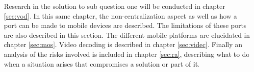 Research in the solution to sub question one will be conducted in chapter \ref{sec:vod}. In this same chapter, the non-centralization aspect as well as how a port can be made to mobile devices are described. The limitations of these ports are also described in this section. The different mobile platforms are elucidated in chapter \ref{sec:mos}. Video decoding is described in chapter \ref{sec:videc}. Finally an analysis of the risks involved is included in chapter \ref{sec:ra}, describing what to do when a situation arises that compromises a solution or part of it.